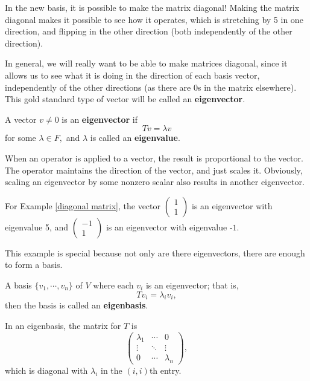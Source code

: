 In the new basis, it is possible to make the matrix diagonal! Making the matrix diagonal makes it possible to see how it operates, which is stretching by 5 in one direction, and flipping in the other direction (both independently of the other direction). 

In general, we will really want to be able to make matrices diagonal, since it allows us to see what it is doing in the direction of each basis vector, independently of the other directions (as there are 0s in the matrix elsewhere). This gold standard type of vector will be called an \textbf{eigenvector}.

\begin{definition}
A vector $v \neq 0$ is an \textbf{eigenvector} if \[Tv = \lambda v\] for some $\lambda \in F,$ and $\lambda$ is called an \textbf{eigenvalue}.
\end{definition}

When an operator is applied to a vector, the result is proportional to the vector. The operator maintains the direction of the vector, and just scales it. Obviously, scaling an eigenvector by some nonzero scalar also results in another eigenvector.

\begin{example}
For Example \ref{diagonal matrix}, the vector $\begin{pmatrix} 1 \\ 1 \end{pmatrix}$ is an eigenvector with eigenvalue 5, and $\begin{pmatrix} -1 \\ 1 \end{pmatrix}$ is an eigenvector with eigenvalue -$1.$
\end{example}

This example is special because not only are there eigenvectors, there are enough to form a basis. 

\begin{definition}
A basis $\{v_1, \cdots, v_n\}$ of $V$ where each $v_i$ is an eigenvector; that is, \[Tv_i = \lambda_i v_i,\] then the basis is called an \textbf{eigenbasis}.
\end{definition}

In an eigenbasis, the matrix for $T$ is \[\begin{pmatrix} \lambda_1 & \cdots & 0 \\
\vdots & \ddots & \vdots \\
0 & \cdots & \lambda_n\end{pmatrix},\] which is diagonal with $\lambda_i$ in the $(i, i)$th entry. 

